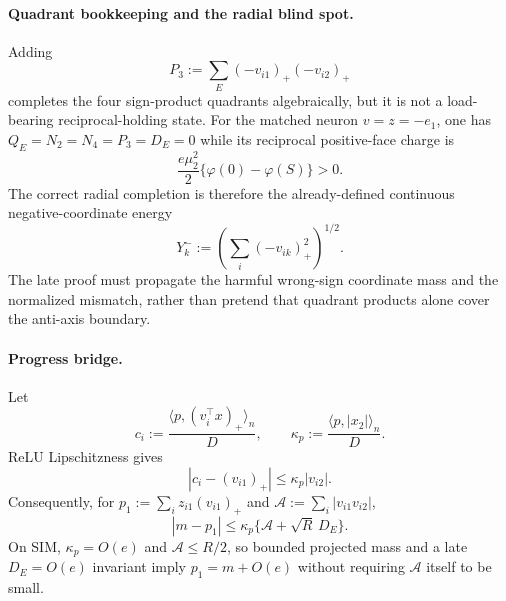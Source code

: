 \documentclass{article} %
\theoremstyle{plain}
\theoremstyle{definition}
\theoremstyle{remark}
\begin{document}
\paragraph{Quadrant bookkeeping and the radial blind spot.}
Adding
\[
 P_3:=\sum_E(-v_{i1})_+(-v_{i2})_+
\]
completes the four sign-product quadrants algebraically, but it is not a
load-bearing reciprocal-holding state.  For the matched neuron
$v=z=-e_1$, one has $Q_E=N_2=N_4=P_3=D_E=0$ while its reciprocal positive-face
charge is
\[
 \frac{e\mu_2^2}{2}\{\varphi(0)-\varphi(S)\}>0.
\]
The correct radial completion is therefore the already-defined continuous
negative-coordinate energy
\[
 Y_k^-:=\left(\sum_i(-v_{ik})_+^2\right)^{1/2}.
\]
The late proof must propagate the harmful wrong-sign coordinate mass and the
normalized mismatch, rather than pretend that quadrant products alone cover
the anti-axis boundary.

\paragraph{Progress bridge.}
Let
\[
 c_i:=\frac{\langle p,(v_i^\top x)_+\rangle_n}{D},\qquad
 \kappa_p:=\frac{\langle p,|x_2|\rangle_n}{D}.
\]
ReLU Lipschitzness gives
\[
\boxed{|c_i-(v_{i1})_+|\le\kappa_p|v_{i2}|.}
\tag{PM-neuron}\label{sbguard:PM-neuron}
\]
Consequently, for
$p_1:=\sum_i z_{i1}(v_{i1})_+$ and
$\mathcal A:=\sum_i|v_{i1}v_{i2}|$,
\[
\boxed{
 |m-p_1|
 \le\kappa_p\{\mathcal A+\sqrt R\,D_E\}.
}
\tag{PM}\label{sbguard:PM}
\]
On SIM, $\kappa_p=O(e)$ and $\mathcal A\le R/2$, so bounded projected mass
and a late $D_E=O(e)$ invariant imply $p_1=m+O(e)$ without requiring
$\mathcal A$ itself to be small.
\end{document}
